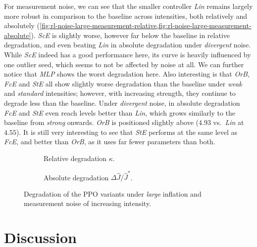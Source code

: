 For measurement noise, we can see that the smaller controller \emph{Lin} remains largely more robust in comparison to the baseline across
intensities, both relatively and absolutely (\cref{fig:rl-noise-large-measurement-relative,fig:rl-noise-large-measurement-absolute}). \emph{ScE} is slightly worse, however far
below the baseline in relative degradation, and even beating \emph{Lin} in absolute degradation under \emph{divergent} noise.
While \emph{ScE} indeed has a good performance here, its curve is heavily influenced by one outlier seed, which
seems to not be affected by noise at all. We can further notice that \emph{MLP}
shows the worst degradation here. Also interesting is that \emph{OrB}, \emph{FcE} and \emph{StE} all show slightly worse
degradation than the baseline under \emph{weak} and \emph{standard} intensities; however, with increasing strength, they continue to degrade
less than the baseline. Under \emph{divergent} noise, in absolute degradation \emph{FcE} and \emph{StE} even reach levels better than \emph{Lin},
which grows similarly to the baseline from \emph{strong} onwards. \emph{OrB} is positioned slightly above ($4.93$ vs.\ \emph{Lin} at $4.55$).
It is still very interesting to see that \emph{StE} performs at the same level as \emph{FcE},
and better than \emph{OrB}, as it uses far fewer parameters than both.

\begin{figure}[htbp]
  \centering
  \begin{subfigure}[t]{0.49\linewidth}
    \centering
    \caption{Relative degradation $\kappa$.}
    \label{fig:rl-noise-large-measurement-relative}
  \end{subfigure}\hfill
  \begin{subfigure}[t]{0.49\linewidth}
    \centering
    \caption{Absolute degradation $\Delta \hat{J} / \hat{J}^{*}$.}
    \label{fig:rl-noise-large-measurement-absolute}
  \end{subfigure}
  \caption{Degradation of the PPO variants under \emph{large} inflation and measurement noise of increasing intensity.}
  \label{fig:rl-noise-large-measurement}
\end{figure}

\section{Discussion}
\label{sec:rl-discussion}

